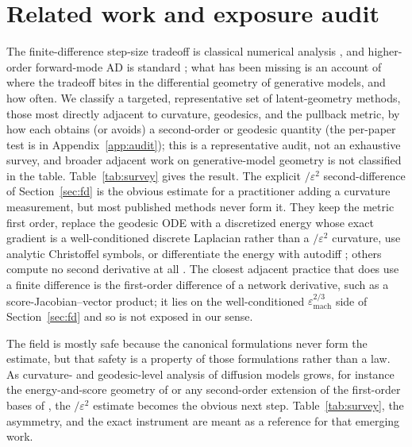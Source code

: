 \documentclass[10pt]{article} %
\newcommand{\eps}{\varepsilon}
\begin{document}
\section{Related work and exposure audit}
\label{sec:survey}
The finite-difference step-size tradeoff is classical numerical analysis
\citep{press2007}, and higher-order forward-mode AD is standard
\citep{griewank2008}; what has been missing is an account of where the tradeoff
bites in the differential geometry of generative models, and how often. We classify
a targeted, representative set of latent-geometry methods, those most directly
adjacent to curvature, geodesics, and the pullback metric, by how each obtains (or
avoids) a second-order or geodesic quantity (the per-paper test is in
Appendix~\ref{app:audit}); this is a representative audit, not an exhaustive survey,
and broader adjacent work on generative-model geometry
\citep{wang2021,tosi2014,saito2025b} is not classified in the table.
Table~\ref{tab:survey} gives the result. The explicit $/\eps^2$ second-difference of
Section~\ref{sec:fd} is the obvious estimate for a practitioner adding a curvature
measurement, but most published methods never form it. They keep the metric first
order, replace the geodesic ODE with a discretized energy whose exact gradient is a
well-conditioned discrete Laplacian rather than a $/\eps^2$ curvature, use analytic
Christoffel symbols, or differentiate the energy with autodiff \citep{yang2018};
others compute no second derivative at all \citep{park2023,chen2018,kwon2023}. The
closest adjacent practice that does use a finite difference is the first-order
difference of a network derivative, such as a score-Jacobian--vector product; it
lies on the well-conditioned $\eps_{\mathrm{mach}}^{2/3}$ side of
Section~\ref{sec:fd} and so is not exposed in our sense.

The field is mostly safe because the canonical formulations never form the
estimate, but that safety is a property of those formulations rather than a law. As curvature- and
geodesic-level analysis of diffusion models grows, for instance the
energy-and-score geometry of \citet{saito2025,saito2025b} or any second-order extension of
the first-order bases of \citet{park2023}, the $/\eps^2$ estimate becomes the
obvious next step. Table~\ref{tab:survey}, the asymmetry, and the exact instrument
are meant as a reference for that emerging work.
\end{document}
